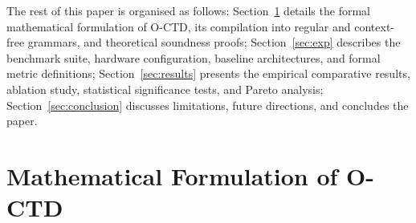 \documentclass[preprint,12pt,3p]{elsarticle}
\begin{document}
The rest of this paper is organised as follows: Section~\ref{sec:math} details the formal mathematical formulation of O-CTD, its compilation into regular and context-free grammars, and theoretical soundness proofs; Section~\ref{sec:exp} describes the benchmark suite, hardware configuration, baseline architectures, and formal metric definitions; Section~\ref{sec:results} presents the empirical comparative results, ablation study, statistical significance tests, and Pareto analysis; Section~\ref{sec:conclusion} discusses limitations, future directions, and concludes the paper.

\section{Mathematical Formulation of O-CTD}
\label{sec:math}

\begin{table}[t]
\centering
\small
\caption{Comparison of O-CTD with published state-of-the-art literature across formal architectural and security dimensions.}
\label{tab:related_work_comparison}
\end{table}
\end{document}
